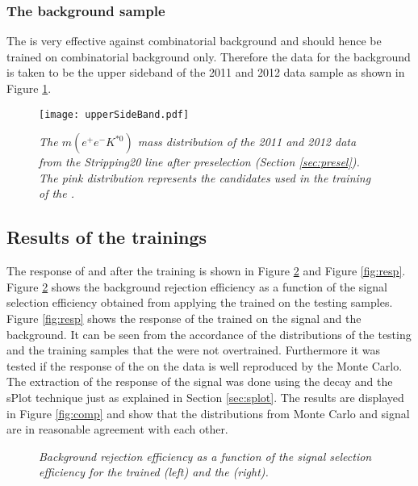 \subsubsection{The background sample}
The \bdtn is very effective against combinatorial background and should hence be trained on combinatorial background only. Therefore the data for the background is taken to be the upper sideband of the 2011 and 2012 data sample as shown in Figure \ref{fig:sb}.
\begin{figure}[ht]
\vspace*{-0.5cm}
\begin{center}
\texttt{[image: upperSideBand.pdf]}
\end{center}
\vspace*{-0.8cm}
\caption{\textit{The $m(e^{+}e^{-}K^{*0})$ mass distribution of the 2011 and 2012 \lhcb data from the \BdKstee Stripping20 line after preselection (Section \ref{sec:presel}). The pink distribution represents the candidates used in the training of the \bdts.}}
\label{fig:sb}
\end{figure}

\subsection{Results of the \bdtn trainings}
The response of \bdta and \bdtb after the training is shown in Figure \ref{fig:BvsS} and Figure \ref{fig:resp}. Figure \ref{fig:BvsS} shows the background rejection efficiency as a function of the signal selection efficiency obtained from applying the trained \bdts on the testing samples.\\
Figure \ref{fig:resp} shows the response of the trained \bdts on the signal and the background. It can be seen from the accordance of the distributions of the testing and the training samples that the \bdts were not overtrained. Furthermore it was tested if the response of the \bdts on the data is well reproduced by the Monte Carlo. The extraction of the \bdtn response of the \lhcb signal was done using the \BdToJPsieeKst decay and the sPlot technique just as explained in Section \ref{sec:splot}. The results are displayed in Figure \ref{fig:comp} and show that the distributions from Monte Carlo and \lhcb signal are in reasonable agreement with each other. \\
\begin{figure}[ht]
\vspace*{-0.2cm}
\begin{center}
\end{center}
\vspace*{-0.8cm}
\caption{\textit{Background rejection efficiency as a function of the signal selection efficiency for the trained \bdta (left) and the \bdtb (right).}}
\label{fig:BvsS}
\end{figure}

